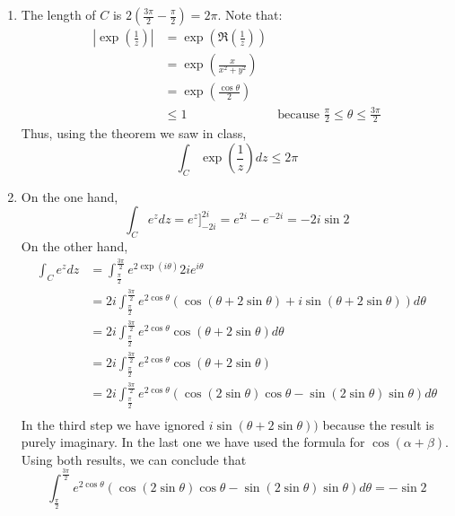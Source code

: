 \documentclass{article}
\renewcommand{\exp}[1]{\operatorname{exp}\left(#1\right)}
\begin{document}
    \begin{enumerate}[label=(\alph*)]
        \item The length of $C$ is $2\left(\frac{3\pi}{2} - \frac{\pi}{2}\right) = 2\pi$. Note that:
        \begin{align*}
            \left|\exp{\frac{1}{z}}\right| &= \exp{\Re\left(\frac{1}{z}\right)} \\
            &= \exp{\frac{x}{x^2 + y^2}} \\
            &= \exp{\frac{\cos{\theta}}{2}} \\
            &\leq 1 & \text{because } \frac{\pi}{2} \leq \theta \leq \frac{3\pi}{2}
        \end{align*}
        Thus, using the theorem we saw in class, 
        \begin{equation*}
            \int_C{\exp{\frac{1}{z}}}dz \leq 2\pi
        \end{equation*}
        \item On the one hand,
        \begin{equation*}
            \int_C e^z dz = e^z \Bigr]^{2i}_{-2i} = e^{2i} - e^{-2i} = -2i\sin{2}
        \end{equation*}
        On the other hand,
        \begin{align*}
            \int_C e^z dz &= \int_{\frac{\pi}{2}}^{\frac{3\pi}{2}} e^{2\exp{i\theta}} 2 i e^{i \theta} \\
            &= 2i\int_{\frac{\pi}{2}}^{\frac{3\pi}{2}} e^{2\cos{\theta}} \left(\cos(\theta + 2\sin \theta) + i\sin(\theta + 2\sin \theta)\right) d\theta \\
            &= 2i\int_{\frac{\pi}{2}}^{\frac{3\pi}{2}} e^{2\cos{\theta}} \cos(\theta + 2\sin \theta) d\theta\\
            &= 2i\int_{\frac{\pi}{2}}^{\frac{3\pi}{2}} e^{2\cos{\theta}} \cos(\theta + 2\sin \theta) \\
            &= 2i \int_{\frac{\pi}{2}}^{\frac{3\pi}{2}} e^{2\cos{\theta}}(\cos(2\sin{\theta})\cos{\theta} - \sin(2\sin{\theta})\sin{\theta}) d\theta \\
        \end{align*}
        In the third step we have ignored $i\sin(\theta + 2\sin \theta))$ because the result is purely imaginary. In the last one we have used the formula for $\cos(\alpha + \beta)$. Using both results, we can conclude that
        \begin{equation*}
            \int_{\frac{\pi}{2}}^{\frac{3\pi}{2}} e^{2\cos{\theta}}(\cos(2\sin{\theta})\cos{\theta} - \sin(2\sin{\theta})\sin{\theta}) d\theta = -\sin{2}
        \end{equation*}
    \end{enumerate}
\end{document}

